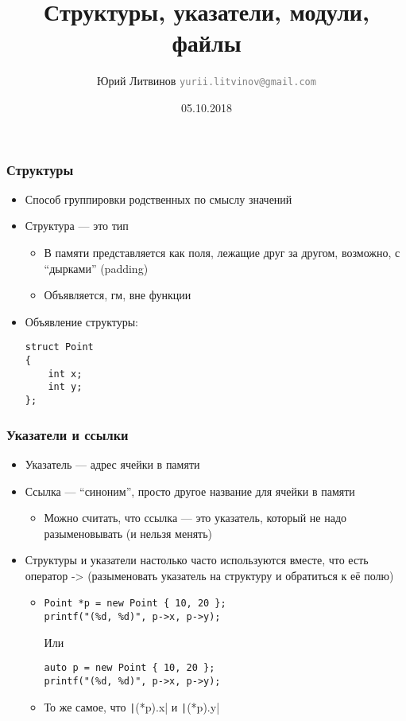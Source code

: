 \documentclass[xetex,mathserif,serif]{beamer}
\title{Структуры, указатели, модули, файлы}
\author[Юрий Литвинов]{Юрий Литвинов \newline \textcolor{gray}{\small\texttt{yurii.litvinov@gmail.com}}}
\date{05.10.2018}
\begin{document}
	
	\frame{\titlepage}
	
	\begin{frame}[fragile]
		\frametitle{Структуры}
		\begin{itemize}
			\item Способ группировки родственных по смыслу значений
			\item Структура --- это тип
			\begin{itemize}
				\item В памяти представляется как поля, лежащие друг за другом, возможно, с ``дырками'' (padding)
				\item Объявляется, гм, вне функции
			\end{itemize}
			\item Объявление структуры:
			\begin{verbatim}
struct Point 
{
    int x;
    int y;
};
			\end{verbatim}
		\end{itemize}
	\end{frame}

	\begin{frame}[fragile]
		\frametitle{Указатели и ссылки}
		\begin{itemize}
			\item Указатель --- адрес ячейки в памяти
			\item Ссылка --- ``синоним'', просто другое название для ячейки в памяти
			\begin{itemize}
				\item Можно считать, что ссылка --- это указатель, который не надо разыменовывать (и нельзя менять)
			\end{itemize}
			\item Структуры и указатели настолько часто используются вместе, что есть оператор -> (разыменовать указатель на структуру и обратиться к её полю)
			\begin{itemize}
				\item 
				\begin{footnotesize}
					\begin{verbatim}
Point *p = new Point { 10, 20 };
printf("(%d, %d)", p->x, p->y);
					\end{verbatim}
					Или
					\begin{verbatim}
auto p = new Point { 10, 20 };
printf("(%d, %d)", p->x, p->y);
					\end{verbatim}
				\end{footnotesize}
				\item То же самое, что \texttt|(*p).x| и \texttt|(*p).y|
			\end{itemize}
		\end{itemize}
	\end{frame}
\end{document}
